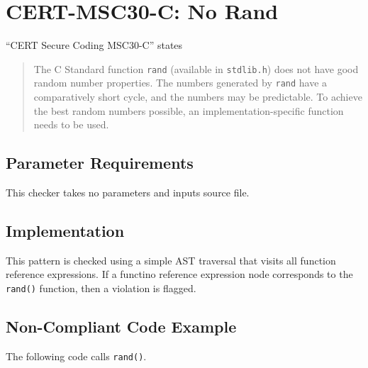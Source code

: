 
\section{CERT-MSC30-C: No Rand}
\label{NoRand::overview}
``CERT Secure Coding MSC30-C'' states
\begin{quote}
The C Standard function {\tt rand} (available in {\tt stdlib.h}) does not have good random number properties. The numbers generated by {\tt rand} have a comparatively short cycle, and the numbers may be predictable. To achieve the best random numbers possible, an implementation-specific function needs to be used.
\end{quote}

\subsection{Parameter Requirements}
This checker takes no parameters and inputs source file.

\subsection{Implementation}
This pattern is checked using a simple AST traversal that visits all function reference expressions. If a functino reference expression node corresponds to the {\tt rand()} function, then a violation is flagged.

\subsection{Non-Compliant Code Example}
The following code calls {\tt rand()}.



